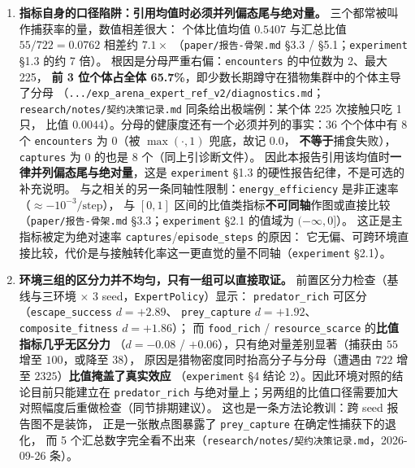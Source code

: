 \begin{enumerate}
  \item \textbf{指标自身的口径陷阱：引用均值时必须并列偏态尾与绝对量。}
  三个都常被叫作捕获率的量，数值相差很大：
  个体比值均值 $0.5407$ 与汇总比值 $55/722=0.0762$ 相差约 $7.1\times$
  （\texttt{paper/报告-骨架.md} \S3.3 / \S5.1；\texttt{experiment} \S1.3 的约 7 倍）。
  根因是分母严重右偏：\texttt{encounters} 的中位数为 2、最大 225，
  \textbf{前 3 位个体占全体 65.7\%}，即少数长期蹲守在猎物集群中的个体主导了分母
  （\texttt{.../exp\_arena\_expert\_ref\_v2/diagnostics.md}；
  \texttt{research/notes/契约决策记录.md} 同条给出极端例：某个体 225 次接触只吃 1 只，
  比值 $0.0044$）。分母的健康度还有一个必须并列的事实：36 个个体中有 8 个
  \texttt{encounters} 为 $0$（被 $\max(\cdot,1)$ 兜底，故记 $0.0$，
  \textbf{不等于}捕食失败），\texttt{captures} 为 $0$ 的也是 8 个（同上引诊断文件）。
  因此本报告引用该均值时\textbf{一律并列偏态尾与绝对量}，这是
  \texttt{experiment} \S1.3 的硬性报告纪律，不是可选的补充说明。
  与之相关的另一条同轴性限制：\texttt{energy\_efficiency} 是非正速率（$\approx-10^{-3}/\text{step}$），
  与 $[0,1]$ 区间的比值类指标\textbf{不可同轴}作图或直接比较
  （\texttt{paper/报告-骨架.md} \S3.3；\texttt{experiment} \S2.1 的值域为 $(-\infty,0]$）。
  这正是主指标被定为绝对速率 \texttt{captures}/\texttt{episode\_steps} 的原因：
  它无偏、可跨环境直接比较，代价是与接触转化率这一更直觉的量不同轴（\texttt{experiment} \S2.1）。

  \item \textbf{环境三组的区分力并不均匀，只有一组可以直接取证。}
  前置区分力检查（基线与三环境 $\times$ 3 seed，\texttt{ExpertPolicy}）显示：
  \texttt{predator\_rich} 可区分（\texttt{escape\_success} $d=+2.89$、
  \texttt{prey\_capture} $d=+1.92$、\texttt{composite\_fitness} $d=+1.86$）；
  而 \texttt{food\_rich} / \texttt{resource\_scarce} 的\textbf{比值指标几乎无区分力}
  （$d=-0.08$ / $+0.06$），只有绝对量差别显著（捕获由 $55$ 增至 $100$，或降至 $38$），
  原因是猎物密度同时抬高分子与分母（遭遇由 $722$ 增至 $2325$）\textbf{比值掩盖了真实效应}
  （\texttt{experiment} \S4 结论 2）。因此环境对照的结论目前只能建立在
  \texttt{predator\_rich} 与绝对量上；另两组的比值口径需要加大对照幅度后重做检查（同节排期建议）。
  这也是一条方法论教训：跨 seed 报告图不是装饰，
  正是一张散点图暴露了 \texttt{prey\_capture} 在确定性捕获下的退化，
  而 5 个汇总数字完全看不出来（\texttt{research/notes/契约决策记录.md}，2026-09-26 条）。


\end{enumerate}
